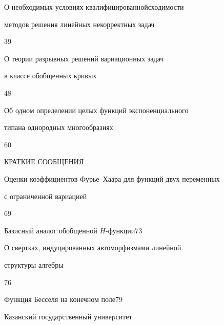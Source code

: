 

{О необходимых условиях квалифицированной\newline сходимости 


методов решения линейных некорректных задач}{39}




{О теории разрывных решений вариационных задач \newline


в классе обобщенных кривых}{48}




{Об одном определении целых функций экспоненциального


типа\newline на однородных многообразиях}{60}





\bigskip





\centerline{КРАТКИЕ СООБЩЕНИЯ}


\bigskip







{Оценки коэффициентов Фурье--Хаара для функций двух переменных\newline


с ограниченной вариацией}{69}




{Базисный аналог обобщенной $H$-функции}{73}




{О свертках, индуцированных автоморфизмами линейной 


структуры алгебры}{76}




{Функция Бесселя на конечном поле}{79}








\vfill


\noindent\raisebox{2pt}{\copyright} Казанский госудаpственный унивеpситет





